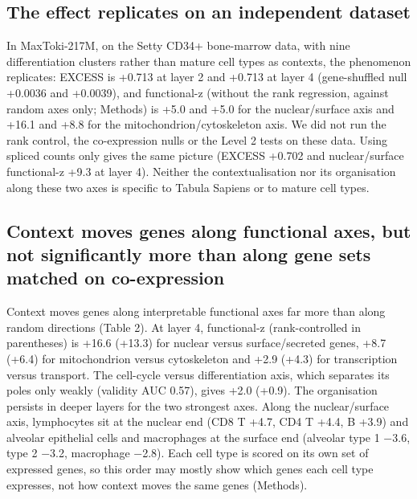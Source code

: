 \documentclass[
  11pt,
]{article}
\begin{document}
\subsection{The effect replicates on an independent
dataset}\label{the-effect-replicates-on-an-independent-dataset}

In MaxToki-217M, on the Setty CD34+ bone-marrow data, with nine
differentiation clusters rather than mature cell types as contexts, the
phenomenon replicates: EXCESS is +0.713 at layer 2 and +0.713 at layer 4
(gene-shuffled null +0.0036 and +0.0039), and functional-z (without the
rank regression, against random axes only; Methods) is +5.0 and +5.0 for
the nuclear/surface axis and +16.1 and +8.8 for the
mitochondrion/cytoskeleton axis. We did not run the rank control, the
co-expression nulls or the Level 2 tests on these data. Using spliced
counts only gives the same picture (EXCESS +0.702 and nuclear/surface
functional-z +9.3 at layer 4). Neither the contextualisation nor its
organisation along these two axes is specific to Tabula Sapiens or to
mature cell types.

\subsection{Context moves genes along functional axes, but not
significantly more than along gene sets matched on
co-expression}\label{context-moves-genes-along-functional-axes-but-not-significantly-more-than-along-gene-sets-matched-on-co-expression}

Context moves genes along interpretable functional axes far more than
along random directions (Table 2). At layer 4, functional-z
(rank-controlled in parentheses) is +16.6 (+13.3) for nuclear versus
surface/secreted genes, +8.7 (+6.4) for mitochondrion versus
cytoskeleton and +2.9 (+4.3) for transcription versus transport. The
cell-cycle versus differentiation axis, which separates its poles only
weakly (validity AUC 0.57), gives +2.0 (+0.9). The organisation persists
in deeper layers for the two strongest axes. Along the nuclear/surface
axis, lymphocytes sit at the nuclear end (CD8 T +4.7, CD4 T +4.4, B
+3.9) and alveolar epithelial cells and macrophages at the surface end
(alveolar type 1 −3.6, type 2 −3.2, macrophage −2.8). Each cell type is
scored on its own set of expressed genes, so this order may mostly show
which genes each cell type expresses, not how context moves the same
genes (Methods).
\end{document}
